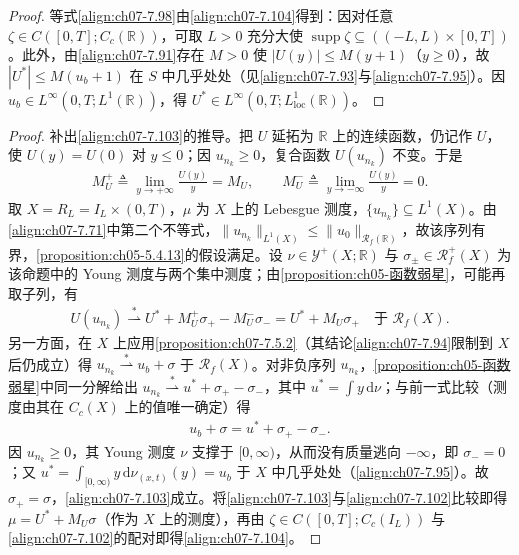 \documentclass[../../main.tex]{subfiles}%
\begin{document}
\begin{proof}
等式\eqref{align:ch07-7.98}由\eqref{align:ch07-7.104}得到：因对任意 $\zeta\in C([0,T];C_c(\mathbb{R}))$，可取 $L>0$ 充分大使 $\operatorname{supp}\zeta\subseteq((-L,L)\times[0,T])$。此外，由\eqref{align:ch07-7.91}存在 $M>0$ 使 $|U(y)|\leqslant M(y+1)$（$y\geqslant0$），故 $|U^*|\leqslant M(u_b+1)$ 在 $S$ 中几乎处处（见\eqref{align:ch07-7.93}与\eqref{align:ch07-7.95}）。因 $u_b\in L^\infty(0,T;L^1(\mathbb{R}))$，得 $U^*\in L^\infty(0,T;L^1_{\mathrm{loc}}(\mathbb{R}))$。
\end{proof}

\begin{proof}
补出\eqref{align:ch07-7.103}的推导。把 $U$ 延拓为 $\mathbb{R}$ 上的连续函数，仍记作 $U$，使 $U(y)=U(0)$ 对 $y\leqslant0$；因 $u_{n_k}\geqslant0$，复合函数 $U(u_{n_k})$ 不变。于是
\begin{align*}
M^+_U\triangleq\lim_{y\to+\infty}\frac{U(y)}{y}=M_U,\qquad
M^-_U\triangleq\lim_{y\to-\infty}\frac{U(y)}{y}=0.
\end{align*}
取 $X=R_L=I_L\times(0,T)$，$\mu$ 为 $X$ 上的 Lebesgue 测度，$\{u_{n_k}\}\subseteq L^1(X)$。由\eqref{align:ch07-7.71}中第二个不等式，$\|u_{n_k}\|_{L^1(X)}\leqslant\|u_0\|_{\mathscr{R}_f(\mathbb{R})}$，故该序列有界，\cref{proposition:ch05-5.4.13}的假设满足。设 $\nu\in\mathcal{Y}^+(X;\mathbb{R})$ 与 $\sigma_\pm\in\mathscr{R}_f^+(X)$ 为该命题中的 Young 测度与两个集中测度；由\cref{proposition:ch05-函数弱星}，可能再取子列，有
\begin{align*}
U(u_{n_k})\stackrel{*}{\rightharpoonup}U^*+M^+_U\sigma_+-M^-_U\sigma_-=U^*+M_U\sigma_+
\quad\text{于 }\mathscr{R}_f(X).
\end{align*}
另一方面，在 $X$ 上应用\cref{proposition:ch07-7.5.2}（其结论\eqref{align:ch07-7.94}限制到 $X$ 后仍成立）得 $u_{n_k}\stackrel{*}{\rightharpoonup}u_b+\sigma$ 于 $\mathscr{R}_f(X)$。对非负序列 $u_{n_k}$，\cref{proposition:ch05-函数弱星}中同一分解给出 $u_{n_k}\stackrel{*}{\rightharpoonup}u^*+\sigma_+-\sigma_-$，其中 $u^*=\int y\,\mathrm{d}\nu$；与前一式比较（测度由其在 $C_c(X)$ 上的值唯一确定）得
\begin{align*}
u_b+\sigma=u^*+\sigma_+-\sigma_-.
\end{align*}
因 $u_{n_k}\geqslant0$，其 Young 测度 $\nu$ 支撑于 $[0,\infty)$，从而没有质量逃向 $-\infty$，即 $\sigma_-=0$；又 $u^*=\int_{[0,\infty)}y\,\mathrm{d}\nu_{(x,t)}(y)=u_b$ 于 $X$ 中几乎处处（\eqref{align:ch07-7.95}）。故 $\sigma_+=\sigma$，\eqref{align:ch07-7.103}成立。将\eqref{align:ch07-7.103}与\eqref{align:ch07-7.102}比较即得 $\mu=U^*+M_U\sigma$（作为 $X$ 上的测度），再由 $\zeta\in C([0,T];C_c(I_L))$ 与\eqref{align:ch07-7.102}的配对即得\eqref{align:ch07-7.104}。
\end{proof}
\end{document}
